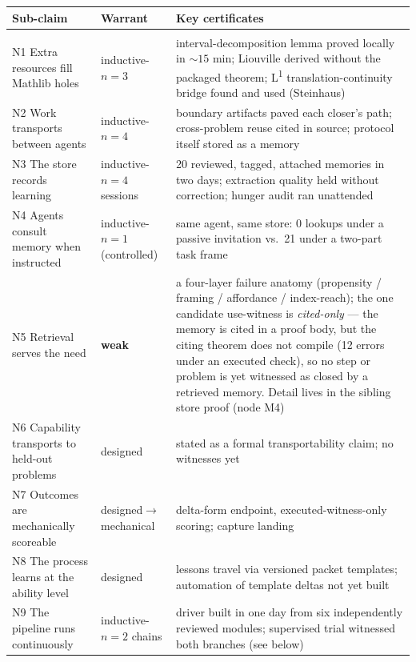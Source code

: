 \documentclass[11pt]{article}
\begin{document}
\begin{center}
\small
\begin{tabular}{p{} p{} p{}}
\textbf{Sub-claim} & \textbf{Warrant} & \textbf{Key certificates}\\[2pt]
\hline\\[-8pt]
N1 Extra resources fill Mathlib holes & inductive-$n{=}3$ &
interval-decomposition lemma proved locally in ${\sim}15$ min;
Liouville derived without the packaged theorem; L\textsuperscript{1}
translation-continuity bridge found and used (Steinhaus)\\[3pt]
N2 Work transports between agents & inductive-$n{=}4$ & boundary
artifacts paved each closer's path; cross-problem reuse cited in
source; protocol itself stored as a memory\\[3pt]
N3 The store records learning & inductive-$n{=}4$ sessions & 20
reviewed, tagged, attached memories in two days; extraction quality
held without correction; hunger audit ran unattended\\[3pt]
N4 Agents consult memory when instructed & inductive-$n{=}1$
(controlled) & same agent, same store: 0 lookups under a passive
invitation vs.\ 21 under a two-part task frame\\[3pt]
N5 Retrieval serves the need & \textbf{weak} & a four-layer
failure anatomy (propensity / framing / affordance / index-reach); the
one candidate use-witness is \emph{cited-only} --- the memory is cited
in a proof body, but the citing theorem does not compile (12 errors
under an executed check), so no step or problem is yet witnessed as
closed by a retrieved memory. Detail lives in the sibling store proof
(node M4)\\[3pt]
N6 Capability transports to held-out problems & designed & stated as
a formal transportability claim; no witnesses yet\\[3pt]
N7 Outcomes are mechanically scoreable & designed$\to$mechanical &
delta-form endpoint, executed-witness-only scoring; capture landing\\[3pt]
N8 The process learns at the ability level & designed & lessons
travel via versioned packet templates; automation of template deltas
not yet built\\[3pt]
N9 The pipeline runs continuously & inductive-$n{=}2$ chains & driver
built in one day from six independently reviewed modules; supervised
trial witnessed both branches (see below)\\
\hline
\end{tabular}
\end{center}
\end{document}
